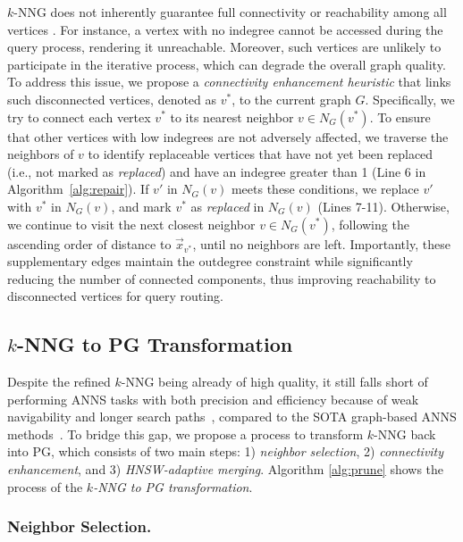 \documentclass[acmsmall]{acmart}
\theoremstyle{remark}
\theoremstyle{definition}
\begin{document}
$k$-NNG does not inherently guarantee full connectivity or reachability among all vertices \cite{navarro2002searching}. For instance, a vertex with no indegree cannot be accessed during the query process, rendering it unreachable. Moreover, such vertices are unlikely to participate in the iterative process, which can degrade the overall graph quality. To address this issue, we propose a \textit{connectivity enhancement heuristic} that links such disconnected vertices, denoted as $v^*$, to the current graph $G$. Specifically, we try to connect each vertex $v^*$ to its nearest neighbor $v \in N_G(v^*)$. To ensure that other vertices with low indegrees are not adversely affected, we traverse the neighbors of $v$ to identify replaceable vertices that have not yet been replaced (i.e., not marked as \textit{replaced}) and have an indegree greater than 1 (Line 6 in Algorithm~\ref{alg:repair}). If $v'$ in $N_G(v)$ meets these conditions, we replace $v'$ with $v^*$ in $N_G(v)$, and mark $v^*$ as \textit{replaced} in $N_G(v)$ (Lines 7-11). Otherwise, we continue to visit the next closest neighbor $v \in N_G(v^*)$, following the ascending order of distance to $\vec{x}_{v^*}$, until no neighbors are left. Importantly, these supplementary edges maintain the outdegree constraint while significantly reducing the number of connected components, thus improving reachability to disconnected vertices for query routing.


\subsection{$k$-NNG to PG Transformation}
\label{sec:knng2pg}

Despite the refined $k$-NNG being already of high quality, it still falls short of performing ANNS tasks with both precision and efficiency because of weak navigability and longer search paths~\cite{li2019approximate, wang2021comprehensive}, compared to the SOTA graph-based ANNS methods~\cite{malkov2018efficient,fu2017fast,jayaram2019diskann}. To bridge this gap, we propose a process to transform $k$-NNG back into PG, which consists of two main steps: 1) \textit{neighbor selection}, 2) \textit{connectivity enhancement}, and 3) \textit{HNSW-adaptive merging}. Algorithm \ref{alg:prune} shows the process of the \textit{$k$-NNG to PG transformation}.

\subsubsection{Neighbor Selection.}
\end{document}
